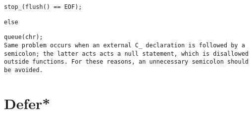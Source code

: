 \s\s\s\s\tt{stop_(flush() == EOF);}

\tt{else}

\s\s\s\s\tt{queue(chr);}\\

Same problem occurs when an external C\_ declaration is followed by a semicolon;
the latter acts acts a null statement, which is disallowed outside functions.
For these reasons, an unnecessary semicolon should be avoided.





\section{Defer*}

